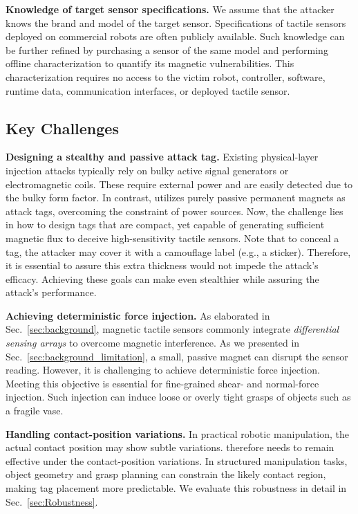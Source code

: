 \noindent\textbf{Knowledge of target sensor specifications.} 
We assume that the attacker knows the brand and model of the target sensor. Specifications of tactile sensors deployed on commercial robots are often publicly available. 
Such knowledge can be further refined by purchasing a sensor of the same model and performing offline characterization to quantify its magnetic vulnerabilities. This characterization requires no access to the victim robot, controller, software, runtime data, communication interfaces, or deployed tactile sensor.

\subsection{Key Challenges}
\noindent\textbf{Designing a stealthy and passive attack tag.} 
Existing physical-layer injection attacks typically rely on bulky active signal generators or electromagnetic coils. 
These require external power and are easily detected due to the bulky form factor.
In contrast, {\name} utilizes purely passive permanent magnets as attack tags, overcoming the constraint of power sources.
Now, the challenge lies in how to design tags that are compact, yet capable of generating sufficient magnetic flux to deceive high-sensitivity tactile sensors.
Note that to conceal a {\name} tag, the attacker may cover it with a camouflage label (e.g., a sticker).
Therefore, it is essential to assure this extra thickness would not impede the attack's efficacy.
Achieving these goals can make {\name} even stealthier while assuring the attack's performance.


\noindent\textbf{Achieving deterministic force injection.} 
As elaborated in Sec.~\ref{sec:background}, magnetic tactile sensors commonly integrate \emph{differential sensing arrays} to overcome magnetic interference. 
As we presented in Sec.~\ref{sec:background_limitation}, a small, passive magnet can disrupt the sensor reading.
However, it is challenging to achieve deterministic force injection. 
Meeting this objective is essential for fine-grained shear- and normal-force injection. Such injection can induce loose or overly tight grasps of objects such as a fragile vase.

\noindent\textbf{Handling contact-position variations.}
In practical robotic manipulation, the actual contact position may show subtle variations. 
{\name} therefore needs to remain effective under the contact-position variations. In structured manipulation tasks, object geometry and grasp planning can constrain the likely contact region, making tag placement more predictable. We evaluate this robustness in detail in Sec.~\ref{sec:Robustness}.


